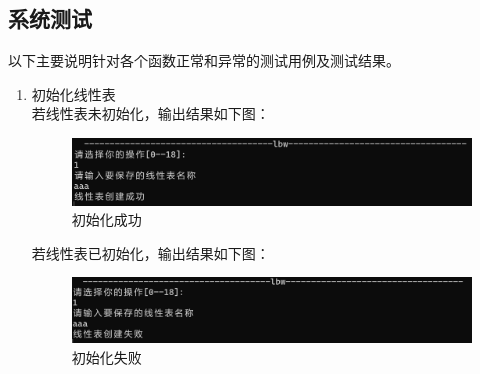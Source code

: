 \documentclass[supercite]{Experimental_Report}
\theoremstyle{definition}
\begin{document}
\subsection{系统测试}
以下主要说明针对各个函数正常和异常的测试用例及测试结果。
	\begin{enumerate}
		\item 初始化线性表\\
		若线性表未初始化，输出结果如下图：
			\begin{figure}[htbp]
			\centering
			\begin{minipage}{0.7\linewidth}
				\centering
				\includegraphics[width=0.9\linewidth]{images/初始化成功.png}
			\end{minipage}
			\caption{初始化成功}
			\label{fig1-8}
		\end{figure}
	若线性表已初始化，输出结果如下图：
	\begin{figure}[htbp]
		\centering
		\begin{minipage}{0.7\linewidth}
			\centering
			\includegraphics[width=0.9\linewidth]{images/初始化失败.png}
		\end{minipage}
		\caption{初始化失败}
		\label{fig1-9}
	\end{figure}


\end{enumerate}
\end{document}

